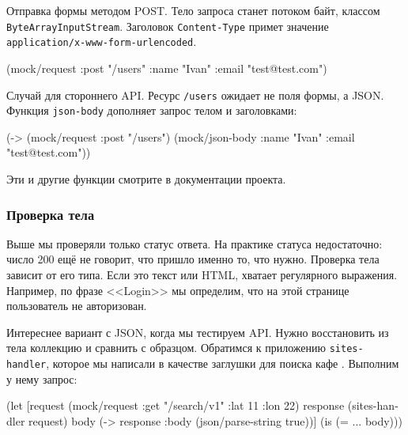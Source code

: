 \noindent
Отправка формы методом POST. Тело запроса станет потоком байт, классом
\verb|ByteArrayInputStream|. Заголовок \verb|Content-Type| примет значение
\verb|application/x-www-form-urlencoded|.

\begin{english}
  \begin{clojure}
(mock/request :post "/users"
              {:name "Ivan" :email "test@test.com"})
  \end{clojure}
\end{english}


\noindent
Случай для стороннего API. Ресурс \verb|/users| ожидает не поля формы, а JSON.
Функция \verb|json-body| дополняет запрос телом и заголовками:

\begin{english}
  \begin{clojure}
(-> (mock/request :post "/users")
    (mock/json-body {:name "Ivan" :email "test@test.com"}))
  \end{clojure}
\end{english}

\noindent
Эти и другие функции смотрите в документации проекта.

\subsubsection*{Проверка тела}

Выше мы проверяли только статус ответа. На практике статуса недостаточно: число
200 ещё не говорит, что пришло именно то, что нужно. Проверка тела зависит от
его типа. Если это текст или HTML, хватает регулярного выражения. Например, по
фразе <<Login>> мы определим, что на этой странице пользователь не авторизован.


Интереснее вариант с JSON, когда мы тестируем API. Нужно восстановить из тела
коллекцию и сравнить с образцом. Обратимся к приложению \verb|sites-handler|,
которое мы написали в качестве заглушки для поиска кафе .
Выполним у нему запрос:

\begin{english}
  \begin{clojure}
(let [request (mock/request :get "/search/v1"
                            {:lat 11 :lon 22})
      response (sites-handler request)
      body (-> response :body (json/parse-string true))]
  (is (= {...} body)))
  \end{clojure}
\end{english}

